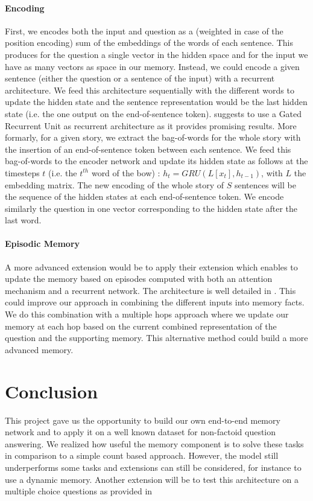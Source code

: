 \documentclass[twoside,11pt]{article}
\begin{document}
\paragraph*{Encoding}
First, we encodes both the input and question as a (weighted in case of the position encoding) sum of the embeddings of the words of each sentence. This produces for the question a single vector in the hidden space and for the input we have as many vectors as space in our memory. Instead, we could encode a given sentence (either the question or a sentence of the input) with a recurrent architecture. We feed this architecture sequentially with the different words to update the hidden state and the sentence representation would be the last hidden state (i.e. the one output on the end-of-sentence token).
\cite{dmn} suggests to use a Gated Recurrent Unit \cite{gru} as recurrent architecture as it provides promising results. More formarly, for a given story, we extract the bag-of-words for the whole story with the insertion of an end-of-sentence token between each sentence. We feed this bag-of-words to the encoder network and update its hidden state as follows at the timesteps $t$ (i.e. the $t^{th}$ word of the bow) : $h_t = GRU(L[x_t], h_{t-1})$, with $L$ the embedding matrix. The new encoding of the whole story of $S$ sentences will be the sequence of the hidden states at each end-of-sentence token. We encode similarly the question in one vector corresponding to the hidden state after the last word.

\paragraph*{Episodic Memory}

A more advanced extension would be to apply their extension which enables to update the memory based on episodes computed with both an attention mechanism and a recurrent network. The architecture is well detailed in \citep{dmn}. This could improve our approach in combining the different inputs into memory facts. We do this combination with a multiple hops approach where we update our memory at each hop based on the current combined representation of the question and the supporting memory. This alternative method could build a more advanced memory.

\section{Conclusion}

This project gave us the opportunity to build our own end-to-end memory network and to apply it on a well known dataset for non-factoid question answering. We realized how useful the memory component is to solve these tasks in comparison to a simple count based approach. However, the model still underperforms some tasks and extensions can still be considered, for instance to use a dynamic memory. Another extension will be to test this architecture on a multiple choice questions as provided in \cite{mctest}
\end{document}
